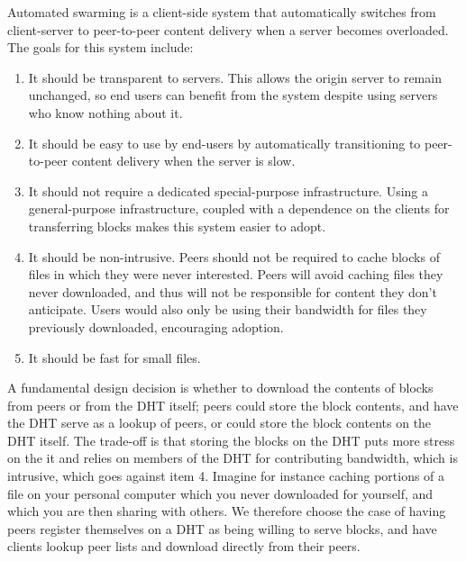 Automated swarming is a client-side system that automatically switches from client-server to peer-to-peer content delivery when a server becomes overloaded.  The goals for this system include:
\begin{enumerate}
\item It should be transparent to servers.  This allows the origin server to remain unchanged, so end users can benefit from the system despite using servers who know nothing about it.
\item It should be easy to use by end-users by automatically transitioning to peer-to-peer content delivery when the server is slow.
\item It should not require a dedicated special-purpose infrastructure.  Using a general-purpose infrastructure, coupled with a dependence on the clients for transferring blocks 
makes this system easier to adopt.
\item It should be non-intrusive.  Peers should not be required to cache blocks of files in which they were never interested.  
Peers will avoid caching files they never downloaded, and thus will not be responsible for content they don't anticipate.  
Users would also only be using their bandwidth for files they previously downloaded, encouraging adoption.
\item It should be fast for small files.
\end{enumerate}

A fundamental design decision is whether to download the contents of blocks from peers or from the DHT itself; peers could store the block contents, 
and have the DHT serve as a lookup of peers, or could store the block contents on the DHT itself.  The trade-off is that storing the blocks on the DHT puts more stress on the 
it and relies on members of the DHT for contributing bandwidth, which is intrusive, which goes against item 4.  
Imagine for instance caching portions of a file on your personal computer which you never downloaded for yourself, and which you are then sharing with others.  
We therefore choose the case of having peers register themselves on a DHT as being willing to serve blocks, and have clients lookup peer lists and download directly from their peers.
